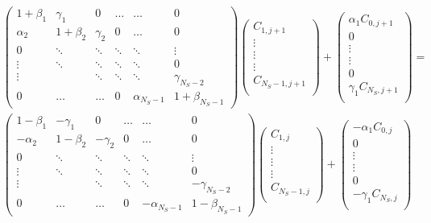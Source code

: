 \documentclass[11pt,a4paper]{article}
\begin{document}
\begin{align*}
\begin{pmatrix}
1 + \beta_1 & \gamma_1 & 0 & \hdots & \hdots & 0\\
\alpha_2 & 1 + \beta_2 & \gamma_2 & 0 & \hdots & 0\\
0 & \ddots & \ddots & \ddots & \ddots & \vdots \\
\vdots & \ddots & \ddots & \ddots & \ddots & 0 \\
\vdots &  & \ddots & \ddots & \ddots & \gamma_{N_S - 2} \\
0 & \hdots & \hdots & 0 & \alpha_{N_S - 1} & 1 + \beta_{N_S - 1} 
\end{pmatrix}
\begin{pmatrix}
C_{1,j+1} \\
\vdots \\
\vdots \\
\vdots \\
C_{N_S - 1,j+1} \\
\end{pmatrix}
+
\begin{pmatrix}
\alpha_{1}C_{0,j+1} \\
0 \\
\vdots \\
\vdots \\
0 \\
\gamma_1 C_{N_S,j+1} \\
\end{pmatrix}
=& \\
\begin{pmatrix}
1 - \beta_1 & - \gamma_1 & 0 & \hdots & \hdots & 0\\
-\alpha_2 & 1 - \beta_2 & -\gamma_2 & 0 & \hdots & 0\\
0 & \ddots & \ddots & \ddots & \ddots & \vdots \\
\vdots & \ddots & \ddots & \ddots & \ddots & 0 \\
\vdots &  & \ddots & \ddots & \ddots & -\gamma_{N_S - 2} \\
0 & \hdots & \hdots & 0 & -\alpha_{N_S - 1} & 1 - \beta_{N_S - 1} 
\end{pmatrix}
\begin{pmatrix}
C_{1,j} \\
\vdots \\
\vdots \\
\vdots \\
C_{N_S - 1,j} \\
\end{pmatrix}
+
\begin{pmatrix}
-\alpha_{1}C_{0,j} \\
0 \\
\vdots \\
\vdots \\
0 \\
-\gamma_1 C_{N_S,j} \\
\end{pmatrix}
\end{align*}
\end{document}
